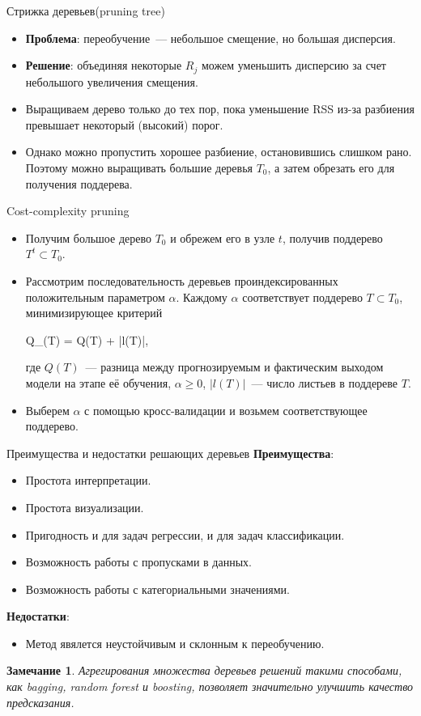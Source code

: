 \documentclass[notheorems, handout]{beamer}
\newtheorem{remark}{Замечание}
\begin{document}
\begin{frame}{Стрижка деревьев(pruning tree)}
\begin{itemize}
	\item \textbf{Проблема}: переобучение~--- небольшое смещение, но большая дисперсия.
	\item \textbf{Решение}: объединяя некоторые $R_{j}$ можем уменьшить дисперсию за счет небольшого увеличения смещения.
	\item Выращиваем дерево только до тех пор, пока уменьшение RSS из-за разбиения превышает некоторый (высокий) порог.
	\item Однако можно пропустить хорошее разбиение, остановившись слишком рано. Поэтому можно выращивать большие деревья $T_{0}$, а затем обрезать его для получения поддерева.
\end{itemize}
\end{frame}

\begin{frame}{Cost-complexity pruning}
\begin{itemize}
	\item Получим большое дерево $T_{0}$ и обрежем его в узле $t$, получив поддерево $T^{t} \subset T_{0}$.
	\item Рассмотрим последовательность деревьев проиндексированных положительным параметром $\alpha$. Каждому $\alpha$ соответствует поддерево $T \subset T_{0}$, минимизирующее критерий
		\begin{flalign*}
			Q_{\alpha}(T) = Q(T) + \alpha |l(T)|,
		\end{flalign*}
где $Q(T)$~--- разница между прогнозируемым и фактическим выходом модели на этапе её обучения, $\alpha \geq 0$, $|l(T)|$~--- число листьев в поддереве $T$. 
	\item Выберем $\alpha$ с помощью кросс-валидации и возьмем соответствующее поддерево.
\end{itemize}
\end{frame}

\begin{frame}{Преимущества и недостатки решающих деревьев}
\textbf{Преимущества}:
\begin{itemize}
	\item Простота интерпретации.
	\item Простота визуализации.
	\item Пригодность и для задач регрессии, и для задач классификации.
	\item Возможность работы с пропусками в данных.
	\item Возможность работы с категориальными значениями.
\end{itemize}
\par\smallskip
\textbf{Недостатки}:
\begin{itemize}
	\item Метод явялется неустойчивым и склонным к переобучению.
\end{itemize}
\par\smallskip
\begin{remark}
	Агрегирования множества деревьев решений такими способами, как bagging, random forest и boosting, позволяет значительно улучшить качество предсказания.
\end{remark}
\end{frame}
\end{document}
